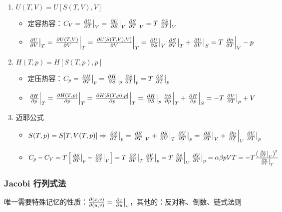 \begin{enumerate}
    \item $U(T, V) = U[S(T, V), V]$\begin{itemize}
              \item 定容热容：$C_V = \left.\pdv{U}{T}\right|_V = \left.\pdv{U}{S}\right|_V \left.\pdv{S}{T}\right|_V = T \left.\pdv{S}{T}\right|_V$
              \item $\left.\pdv{U}{V}\right|_T = \left.\pdv{U(T, V)}{V}\right|_T = \left.\pdv{U[S(T, V), V]}{V}\right|_T = \left.\pdv{U}{S}\right|_V \left.\pdv{S}{V}\right|_T + \left.\pdv{U}{V}\right|_S = T \left.\pdv{p}{T}\right|_V - p$
          \end{itemize}
    \item $H(T, p) = H[S(T, p), p]$\begin{itemize}
              \item 定压热容：$C_p = \left.\pdv{H}{T}\right|_p = \left.\pdv{H}{S}\right|_p \left.\pdv{S}{T}\right|_p = T \left.\pdv{S}{T}\right|_p$
              \item $\left.\pdv{H}{p}\right|_T = \left.\pdv{H(T, p)}{p}\right|_T = \left.\pdv{H[S(T, p), p]}{p}\right|_T = \left.\pdv{H}{S}\right|_p \left.\pdv{S}{p}\right|_T + \left.\pdv{H}{p}\right|_S = - T \left.\pdv{V}{T}\right|_p + V$
          \end{itemize}
    \item 迈耶公式\begin{itemize}
              \item $S(T, p) = S[T, V(T, p)] \Rightarrow \left.\pdv{S}{T}\right|_p = \left.\pdv{S}{T}\right|_V + \left.\pdv{S}{V}\right|_T \left.\pdv{V}{T}\right|_p = \left.\pdv{S}{T}\right|_V + \left.\pdv{p}{T}\right|_V \left.\pdv{V}{T}\right|_p$
              \item $C_p - C_V = T \left[\left.\pdv{S}{T}\right|_p - \left.\pdv{S}{T}\right|_V\right] = T \left.\pdv{S}{V}\right|_T \left.\pdv{V}{T}\right|_p = T \left.\pdv{p}{T}\right|_V \left.\pdv{V}{T}\right|_p = \alpha \beta p V T = - T \frac{\left(\left.\pdv{p}{T}\right|_V\right)^2}{\left.\pdv{p}{V}\right|_T}$
          \end{itemize}
\end{enumerate}

\subsubsection{Jacobi 行列式法}

唯一需要特殊记忆的性质：$\pdv{(x, v)}{(u, v)} = \left.\pdv{x}{u}\right|_v$，其他的：反对称、倒数、链式法则

